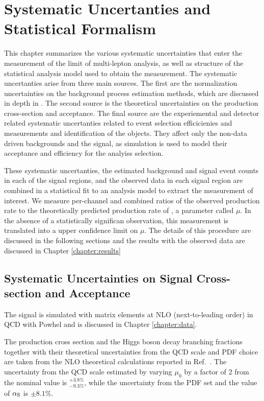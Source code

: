 \chapter[Systematic Uncertanties and Statistical Formalism][Systematic Uncertainties and Statistical Formalism]{Systematic Uncertanties and Statistical Formalism}
\label{chapter:systematics} 

This chapter summarizes the various systematic uncertainties that enter the measurement of the limit of \tth multi-lepton analysis, as well as structure of the statistical 
analysis model used to obtain the measurement. The systematic uncertanties arise
from three main sources. The first are the normalization uncertainties on the background process estimation methods, which are discussed in depth in \label{chapter:backgrounds}. 
The second source is the theoretical uncertainties on the \tth production cross-section and acceptance. The final source are the experiemental and detector related systematic
uncertanties related to event selection efficicienies and measurements and identification of the objects. They affect only the non-data driven backgrounds and the \tth
signal, as simulation is used to model their acceptance and efficiency for the analyiss selection. 

These systematic uncertanties, the estimated background and signal event counts in each of the signal regions, and the observed data in each signal region are combined
in a statistical fit to an analysis model to extract the measurement of interest. We measure per-channel and combined ratios of the observed production rate to the 
theoretically predicted production rate of \tth, a parameter called $\mu$. In the absence of a statistically significan observation, this measurement is translated into a upper confidence limit
on $\mu$. The details of this procedure are discussed in the following sections and the results with the observed data are discussed in Chapter \ref{chapter:results}

\section{Systematic Uncertainties on Signal Cross-section and Acceptance}

The \tth signal is simulated with matrix elements at NLO (next-to-leading order) in QCD with {\textsc Powhel} and is discussed in Chapter \ref{chapter:data}.  

The production cross section and the Higgs boson decay branching fractions together with their theoretical uncertainties from the QCD scale and PDF choice are taken from the NLO theoretical calculations reported in Ref.~\cite{Heinemeyer:2013tqa}. The uncertainty from the QCD scale estimated by varying $\mu_{0}$ by a factor of 2 from the nominal value is $^{+3.8\%}_{-9.3\%}$, while the uncertainty from the PDF set and the value of $\alpha_{\rm S}$ is $\pm 8.1\%$.\\

